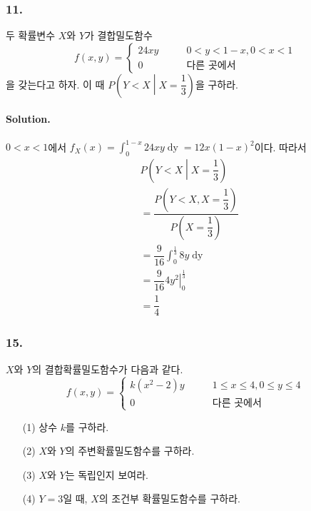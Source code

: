 \subsubsection{11.} 두 확률변수 $X$와 $Y$가 결합밀도함수
\[f\left(x, y\right) = \left\{
\begin{array}{ll}
	24xy & \qquad 0<y<1-x, 0<x<1 \\
	0 & \qquad\textrm{다른 곳에서}
\end{array}
\right. \]
을 갖는다고 하자. 이 때 $P\left(Y<X\middle|X=\dfrac{1}{3}\right)$을 구하라.

\paragraph{Solution.} $0<x<1$에서 $\displaystyle f_X\left(x\right) = \int_0^{1-x} 24xy\mathop{dy} = 12x\left(1-x\right)^2$이다. 따라서
\begin{align*}
	& P\left(Y<X\middle|X=\dfrac{1}{3}\right) \\
	&= \dfrac{P\left(Y<X, X=\dfrac{1}{3}\right)}{P\left(X=\dfrac{1}{3}\right)}\\
	&= \dfrac{9}{16} \int_0^\frac{1}{3} 8y \mathop{dy} \\
	&= \dfrac{9}{16} \left.4y^2\right|_0^\frac{1}{3} \\
	&= \dfrac{1}{4}
\end{align*}

\subsubsection{15.} $X$와 $Y$의 결합확률밀도함수가 다음과 같다.
\[f\left(x, y\right) = \left\{
\begin{array}{ll}
	k\left(x^2-2\right)y & \qquad 1\leq x\leq 4, 0\leq y\leq 4 \\
	0 & \qquad\textrm{다른 곳에서}
\end{array}
\right. \]

\begin{itemize}
  \item [(1)] 상수 $k$를 구하라.
  \item [(2)] $X$와 $Y$의 주변확률밀도함수를 구하라.
  \item [(3)] $X$와 $Y$는 독립인지 보여라.
  \item [(4)] $Y=3$일 때, $X$의 조건부 확률밀도함수를 구하라.
\end{itemize}

